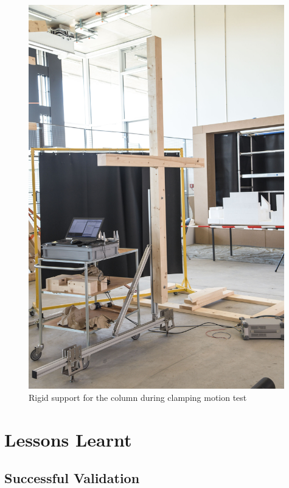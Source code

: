 \begin{figure}
    \centering
    \includegraphics[width=0.99\textwidth]{images/04-4+5/cl1-test-wood-mount.jpg}
    \caption{Rigid support for the column during clamping motion test}
    \label{fig:timber-joint-for-cl1-test-ground-support}
\end{figure}

\FloatBarrier

\section{Lessons Learnt}
\label{section:exploration-1-lessions-learnt}

\subsection{Successful Validation}
\label{subsection:exploration-1-successful-validation}

